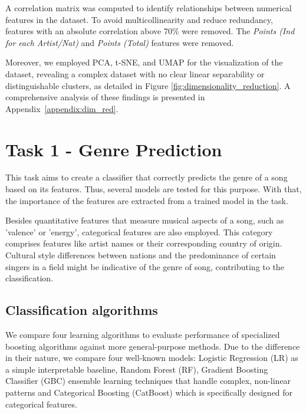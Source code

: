 \documentclass{article}
\begin{document}
A correlation matrix was computed to identify relationships between numerical features in the dataset. To avoid multicollinearity and reduce redundancy, features with an absolute correlation above 70\% \cite{shrestha2020detecting} were removed. The \textit{Points (Ind for each Artist/Nat)} and \textit{Points (Total)} features were removed.


Moreover, we employed PCA, t-SNE, and UMAP for the visualization of the dataset, revealing a complex dataset with no clear linear separability or distinguishable clusters, as detailed in Figure \ref{fig:dimensionality_reduction}. A comprehensive analysis of these findings is presented in Appendix~\ref{appendix:dim_red}.


\section{Task 1 - Genre Prediction}

This task aims to create a classifier that correctly predicts the genre of a song based on its features. Thus, several models are tested for this purpose. With that, the importance of the features are extracted from a trained model in the task. 

Besides quantitative features that measure musical aspects of a song, such as 'valence' or 'energy', categorical features are also employed. This category comprises features like artist names or their corresponding country of origin. Cultural style differences between nations and the predominance of certain singers in a field might be indicative of the genre of song, contributing to the classification. 

\subsection{ Classification algorithms
} \label{sec:Classification algorithms1}

We compare four learning algorithms to evaluate performance of specialized boosting algorithms against more general-purpose methods. Due to the difference in their nature, we compare four well-known models: Logistic Regression (LR) as a simple interpretable baseline, Random Forest (RF), Gradient Boosting Classifier (GBC) ensemble learning techniques that handle complex, non-linear patterns and Categorical Boosting (CatBoost) which is specifically designed for categorical features.
\end{document}
